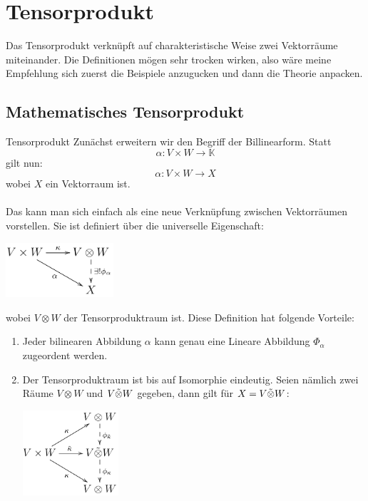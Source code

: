 \newpage
\section[Einführung in die Tensorprodukte]{Tensorprodukt}
Das Tensorprodukt verknüpft auf charakteristische Weise zwei Vektorräume miteinander. Die Definitionen mögen sehr trocken wirken, also wäre meine Empfehlung sich zuerst die Beispiele anzugucken und dann die Theorie anpacken.
\subsection{Mathematisches Tensorprodukt}
\begin{Def}{Tensorprodukt}
    Zunächst erweitern wir den Begriff der Billinearform. Statt
    $$\alpha: V\times W \rightarrow \mathbb{K}$$
    gilt nun:
    $$\alpha: V\times W \rightarrow X$$
    wobei $X$ ein Vektorraum ist. \\ \\
    Das  kann man sich einfach als eine neue Verknüpfung zwischen Vektorräumen vorstellen. Sie ist definiert über die universelle Eigenschaft:
    \begin{center}
    \includegraphics[width=0.3\textwidth]{Dateien/Tensor1.png}
\end{center}
wobei $V\otimes W$ der Tensorproduktraum ist. Diese Definition hat folgende Vorteile: \\
\begin{enumerate}
    \item Jeder bilinearen Abbildung $\alpha$ kann genau eine Lineare Abbildung $\Phi_\alpha$ zugeordent werden.
    \item Der Tensorproduktraum ist bis auf Isomorphie eindeutig. Seien nämlich zwei Räume $V\otimes W$ und $V\Tilde{\otimes}W$ gegeben, dann gilt für $X=V\Tilde{\otimes}W$:
\begin{center}
    \includegraphics[width=0.28\textwidth]{Dateien/Tensor2.png}

\end{center}
\end{enumerate}
\end{Def}
